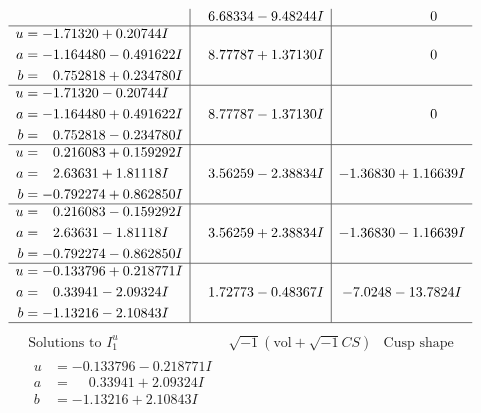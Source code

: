 \documentclass[1p]{elsarticle_modified}
\theoremstyle{definition}
\newcommand{\I}{\sqrt{-1}}
\begin{document}
$$\begin{array}{c|c|c}
 & \phantom{-}6.68334 - 9.48244 I & \phantom{-0.000000 } 0 \\ \hline\begin{aligned}
u &= -1.71320 + 0.20744 I \\
a &= -1.164480 - 0.491622 I \\
b &= \phantom{-}0.752818 + 0.234780 I\end{aligned}
 & \phantom{-}8.77787 + 1.37130 I & \phantom{-0.000000 } 0 \\ \hline\begin{aligned}
u &= -1.71320 - 0.20744 I \\
a &= -1.164480 + 0.491622 I \\
b &= \phantom{-}0.752818 - 0.234780 I\end{aligned}
 & \phantom{-}8.77787 - 1.37130 I & \phantom{-0.000000 } 0 \\ \hline\begin{aligned}
u &= \phantom{-}0.216083 + 0.159292 I \\
a &= \phantom{-}2.63631 + 1.81118 I \\
b &= -0.792274 + 0.862850 I\end{aligned}
 & \phantom{-}3.56259 - 2.38834 I & -1.36830 + 1.16639 I \\ \hline\begin{aligned}
u &= \phantom{-}0.216083 - 0.159292 I \\
a &= \phantom{-}2.63631 - 1.81118 I \\
b &= -0.792274 - 0.862850 I\end{aligned}
 & \phantom{-}3.56259 + 2.38834 I & -1.36830 - 1.16639 I \\ \hline\begin{aligned}
u &= -0.133796 + 0.218771 I \\
a &= \phantom{-}0.33941 - 2.09324 I \\
b &= -1.13216 - 2.10843 I\end{aligned}
 & \phantom{-}1.72773 - 0.48367 I & -7.0248 - 13.7824 I\\
 \hline 
 \end{array}$$\newpage$$\begin{array}{c|c|c}  
\text{Solutions to }I^u_{1}& \I (\text{vol} + \sqrt{-1}CS) & \text{Cusp shape}\\
 \hline 
\begin{aligned}
u &= -0.133796 - 0.218771 I \\
a &= \phantom{-}0.33941 + 2.09324 I \\
b &= -1.13216 + 2.10843 I\end{aligned}

\end{array}$$
\end{document}
